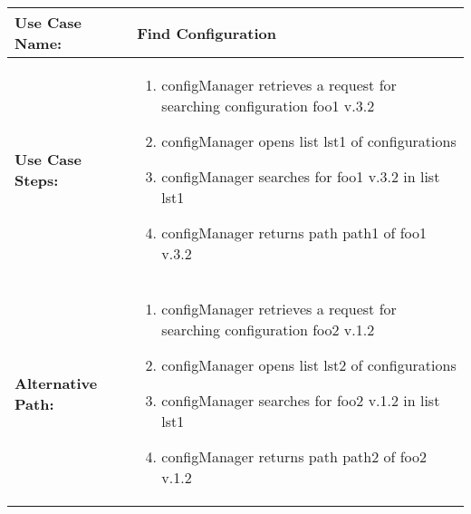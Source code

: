 
\begin{tabularx}{\linewidth}{|l|X|}
\hline
\textbf{Use Case Name:} & \textbf{Find Configuration} \\
\hline
\textbf{Use Case Steps:} & 
\begin{minipage}{\linewidth} 
  \vspace{0.05em}
  \begin{enumerate}
	\item configManager retrieves a request for searching configuration foo1 v.3.2
	\item configManager opens list lst1 of configurations
	\item configManager searches for foo1 v.3.2 in list lst1
	\item configManager returns path path1 of foo1 v.3.2
  \end{enumerate}
  \vspace{0.05em}
\end{minipage}
\\
\hline 
\textbf{Alternative Path:} &
\begin{minipage}{\linewidth}
  \vspace{0.05em} 
  \begin{enumerate}
	\item configManager retrieves a request for searching configuration foo2 v.1.2
	\item configManager opens list lst2 of configurations
	\item configManager searches for foo2 v.1.2 in list lst1
	\item configManager returns path path2 of foo2 v.1.2
  \end{enumerate}
  \vspace{0.05em} 
\end{minipage}
\\
\hline
\end{tabularx}


